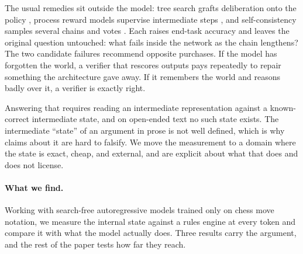 \documentclass[11pt]{article}
\theoremstyle{remark}
\begin{document}
The usual remedies sit outside the model: tree search grafts deliberation onto
the policy \citep{yao2023tree}, process reward models supervise intermediate
steps \citep{lightman2024lets}, and self-consistency samples several chains and
votes \citep{wang2023selfconsistency}. Each raises end-task accuracy and leaves
the original question untouched: what fails inside the network as the chain
lengthens? The two candidate failures recommend opposite purchases. If the model
has forgotten the world, a verifier that rescores outputs pays repeatedly to
repair something the architecture gave away. If it remembers the world and
reasons badly over it, a verifier is exactly right.

Answering that requires reading an intermediate representation against a
known-correct intermediate state, and on open-ended text no such state exists.
The intermediate ``state'' of an argument in prose is not well defined, which is
why claims about it are hard to falsify. We move the measurement to a domain
where the state is exact, cheap, and external, and are explicit about what that
does and does not license.

\paragraph{What we find.}
Working with search-free autoregressive models trained only on chess move
notation, we measure the internal state against a rules engine at every token and
compare it with what the model actually does. Three results carry the argument, and the rest of
the paper tests how far they reach.
\end{document}
